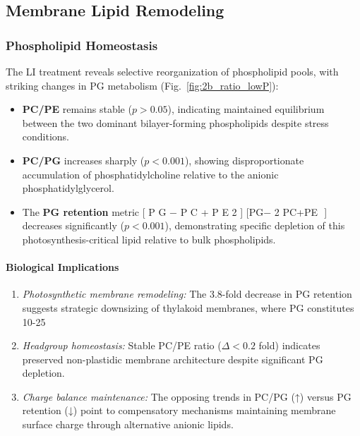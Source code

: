 \documentclass[10pt,letterpaper]{article}
\begin{document}
\subsection*{Membrane Lipid Remodeling}

\subsubsection*{Phospholipid Homeostasis}

The LI treatment reveals selective reorganization of phospholipid pools, with striking changes in PG metabolism (Fig.~\ref{fig:2b_ratio_lowP}):

\begin{itemize}
\item \textbf{PC/PE} remains stable ($p>0.05$), indicating maintained equilibrium between the two dominant bilayer-forming phospholipids despite stress conditions.

\item \textbf{PC/PG} increases sharply ($p<0.001$), showing disproportionate accumulation of phosphatidylcholine relative to the anionic phosphatidylglycerol.

\item The \textbf{PG retention} metric 
[
P
G
−
P
C
+
P
E
2
]
[PG− 
2
PC+PE
​
 ] decreases significantly ($p<0.001$), demonstrating specific depletion of this photosynthesis-critical lipid relative to bulk phospholipids.
\end{itemize}

\paragraph{Biological Implications}
\begin{enumerate}
\item \textit{Photosynthetic membrane remodeling:}
The 3.8-fold decrease in PG retention suggests strategic downsizing of thylakoid membranes, where PG constitutes 10-25%

\item \textit{Headgroup homeostasis:}
Stable PC/PE ratio ($\Delta<0.2$ fold) indicates preserved non-plastidic membrane architecture despite significant PG depletion.

\item \textit{Charge balance maintenance:}
The opposing trends in PC/PG (↑) versus PG retention (↓) point to compensatory mechanisms maintaining membrane surface charge through alternative anionic lipids.
\end{enumerate}
\end{document}
